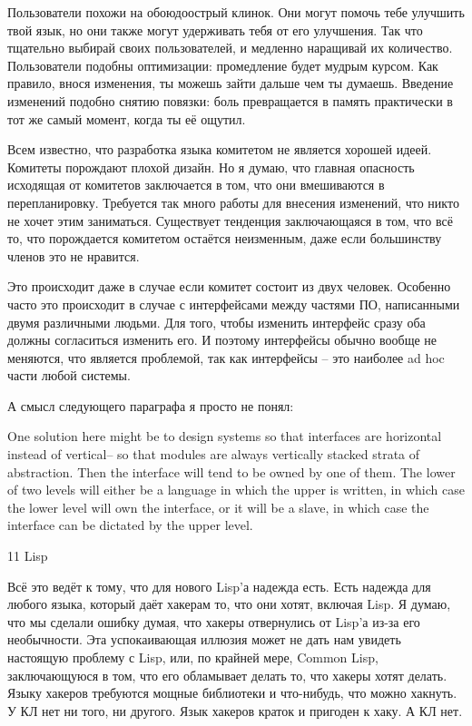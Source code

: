 \documentclass[ebook,12pt,oneside,openany]{memoir}
\begin{document}
Пользователи похожи на обоюдоострый клинок. Они могут помочь тебе
улучшить твой язык, но они также могут удерживать тебя от его
улучшения. Так что тщательно выбирай своих пользователей, и медленно
наращивай их количество. Пользователи подобны оптимизации: промедление
будет мудрым курсом. Как правило, внося изменения, ты можешь зайти
дальше чем ты думаешь. Введение изменений подобно снятию повязки: боль
превращается в память практически в тот же самый момент, когда ты её
ощутил.

Всем известно, что разработка языка комитетом не является хорошей
идеей. Комитеты порождают плохой дизайн. Но я думаю, что главная
опасность исходящая от комитетов заключается в том, что они
вмешиваются в перепланировку. Требуется так много работы для внесения
изменений, что никто не хочет этим заниматься. Существует тенденция
заключающаяся в том, что всё то, что порождается комитетом остаётся
неизменным, даже если большинству членов это не нравится.

Это происходит даже в случае если комитет состоит из двух человек.
Особенно часто это происходит в случае с интерфейсами между частями
ПО, написанными двумя различными людьми. Для того, чтобы изменить
интерфейс сразу оба должны согласиться изменить его. И поэтому
интерфейсы обычно вообще не меняются, что является проблемой, так как
интерфейсы -- это наиболее ad hoc части любой системы.

А смысл следующего параграфа я просто не понял:

One solution here might be to design systems so that interfaces are
horizontal instead of vertical-- so that modules are always vertically
stacked strata of abstraction. Then the interface will tend to be
owned by one of them. The lower of two levels will either be a
language in which the upper is written, in which case the lower level
will own the interface, or it will be a slave, in which case the
interface can be dictated by the upper level.

11 Lisp

Всё это ведёт к тому, что для нового Lisp'а надежда есть. Есть надежда
для любого языка, который даёт хакерам то, что они хотят, включая
Lisp. Я думаю, что мы сделали ошибку думая, что хакеры отвернулись от
Lisp'а из-за его необычности. Эта успокаивающая иллюзия может не дать
нам увидеть настоящую проблему с Lisp, или, по крайней мере, Common
Lisp, заключающуюся в том, что его обламывает делать то, что хакеры
хотят делать. Языку хакеров требуются мощные библиотеки и что-нибудь,
что можно хакнуть. У КЛ нет ни того, ни другого. Язык хакеров краток и
пригоден к хаку. А КЛ нет.
\end{document}
